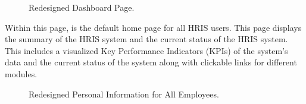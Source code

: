     \begin{figure}[H]
        \centering
        \caption{Redesigned Dashboard Page.}
        \label{fig:app-manager}
    \end{figure}

    Within this page, is the default home page for all HRIS users. This page displays the summary of the HRIS system and the current status of the HRIS system. This includes a visualized Key Performance Indicators (KPIs) of the system's data and the current status of the system along with clickable links for different modules.

    \begin{figure}[H]
        \centering
        \caption{Redesigned Personal Information for All Employees.}
        \label{fig:app-pi}
    \end{figure}

